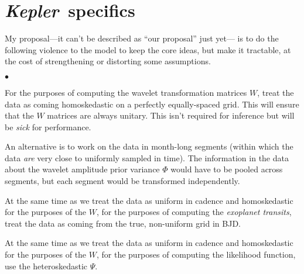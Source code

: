 \documentclass[12pt,letterpaper]{article}
\renewenvironment{itemize}{\begin{list}{$\bullet$}{%
  \setlength{\topsep}{0.0ex}%
  \setlength{\parsep}{0.0ex}%
  \setlength{\partopsep}{0.0ex}%
  \setlength{\itemsep}{0.0ex}%
  \setlength{\leftmargin}{1.5\parindent}}}{\end{list}}
\newcommand{\project}[1]{\textsl{#1}}
\newcommand{\Kepler}{\project{Kepler}}
\newcommand{\noisetensor}{\Psi}
\newcommand{\wavetensor}{\Phi}
\newcommand{\weightmatrix}{W}
\begin{document}
\section{\Kepler\ specifics}

My proposal---it can't be described as ``our proposal'' just yet---%
is to do the following violence to the model to keep the core ideas,
but make it tractable, at the cost of strengthening or distorting some assumptions.
\begin{itemize}
\item
For the purposes of computing the wavelet transformation matrices $\weightmatrix$,
treat the data as coming homoskedastic on a perfectly equally-spaced grid.
This will ensure that the $\weightmatrix$ matrices are always unitary.
This isn't required for inference but will be \emph{sick} for performance.
\item
An alternative is to work on the data in month-long segments
(within which the data \emph{are} very close to uniformly sampled in time).
The information in the data about the wavelet amplitude prior variance $\wavetensor$
would have to be pooled across segments, but each segment would be transformed independently.
\item
At the same time as we treat the data as uniform in cadence and homoskedastic for the purposes
of the $\weightmatrix$, for the purposes of computing the \emph{exoplanet transits},
treat the data as coming from the true, non-uniform grid in BJD.
\item
At the same time as we treat the data as uniform in cadence and homoskedastic for the purposes
of the $\weightmatrix$, for the purposes of computing the likelihood function,
use the heteroskedastic $\noisetensor$.
\end{itemize}
\end{document}

